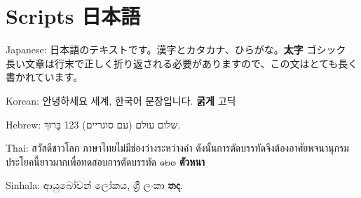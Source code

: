 \documentclass{article}
\begin{document}
\section{Scripts 日本語}
Japanese: 日本語のテキストです。漢字とカタカナ、ひらがな。\textbf{太字} \textsf{ゴシック} 長い文章は行末で正しく折り返される必要がありますので、この文はとても長く書かれています。

Korean: 안녕하세요 세계, 한국어 문장입니다. \textbf{굵게} \textsf{고딕}

Hebrew: שלום עולם (עם סוגריים) 123 בָּרוּךְ.

Thai: สวัสดีชาวโลก ภาษาไทยไม่มีช่องว่างระหว่างคำ ดังนั้นการตัดบรรทัดจึงต้องอาศัยพจนานุกรม ประโยคนี้ยาวมากเพื่อทดสอบการตัดบรรทัด ๑๒๓ \textbf{ตัวหนา}

Sinhala: ආයුබෝවන් ලෝකය, ශ්‍රී ලංකා \textbf{තද}.
\end{document}

